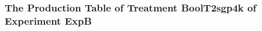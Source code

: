  \begin{frame}
 \fontsize{8pt}{9pt}\selectfont
 \frametitle{ The Production Table of Treatment BoolT2sgp4k of Experiment ExpB }

 \label{ExpBGrammarTable012.tex}  
 \end{frame}

